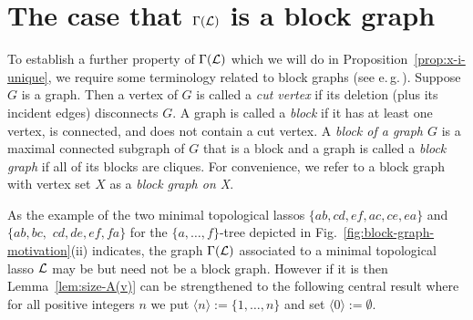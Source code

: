 \section{The case that $\Gamma({\mathcal L})$ is a 
block graph}\label{sec:blockgraph}



To establish a further property of $\Gamma({\mathcal L})$ 
which we will do in Proposition~\ref{prop:x-i-unique}, we require some
terminology related to block graphs (see e.\,g.\,\cite{diestel}). 
Suppose $G$ is a graph. Then a vertex of $G$ 
is called a {\em cut vertex} if its deletion (plus its
incident edges) disconnects $G$. A graph is called a {\em block} 
if it has at least one vertex, is connected, and does 
not contain a cut vertex. A {\em block of a graph $G$} is a maximal connected
subgraph of $G$ that is a block and a graph is called a {\em block graph}
if all of its blocks are cliques. For convenience, we refer to a
block graph with vertex set $X$ as a {\em block graph on X}.

As the example of the two minimal topological lassos 
$
\{ab,cd,ef,ac,ce,ea\}$ and $
\{ab, bc,$  $cd, de, ef, fa\}$ 
for the $\{a,\ldots,f\}$-tree
depicted in Fig.~\ref{fig:block-graph-motivation}(ii)
indicates, the graph $\Gamma({\mathcal L})$  associated to a
 minimal topological lasso  ${\mathcal L}$
may be but need not be a block graph. 
However if it is
then Lemma~\ref{lem:size-A(v)}
can be strengthened to the following central result
where for all positive integers $n$ we 
put $\langle n\rangle :=\{1,\ldots, n\}$ and set
$\langle 0\rangle:=\emptyset$.

